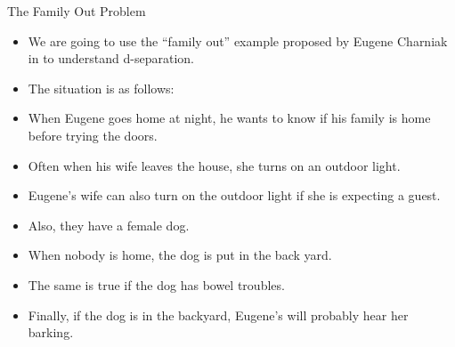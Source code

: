 \documentclass[handout]{beamer}
\begin{document}
\begin{frame}{The Family Out Problem}
\scriptsize{
\begin{itemize}
\item We are going to use the ``family out'' example proposed by Eugene Charniak in  \cite{charniak1991bayesian} to understand d-separation.

\item The situation is as follows:

\item When Eugene goes home at night, he wants to know if his family is home before trying the doors. 

\item Often when his wife leaves the house, she turns on an outdoor light. 

\item Eugene's wife can also turn on the outdoor light if she is expecting a guest.

\item Also, they have a female dog. 

\item When nobody is home, the dog is put in the back yard. 

\item The same is true if the dog has bowel troubles. 

\item Finally, if the dog is in the backyard, Eugene's will probably hear her barking.

 
\end{itemize}



} 

\end{frame}
\end{document}
